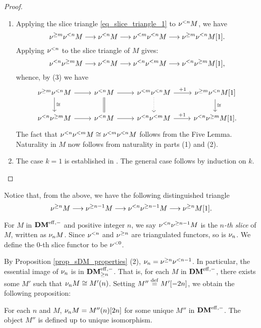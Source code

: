 \begin{proof}
\begin{enumerate}
\item Applying the slice triangle \eqref{eq_slice_triangle_1} to
$\slDM{n} M$, we have
\[
\sgDM{m} \slDM{n} M \to \slDM{n} M \to \slDM{m} \slDM{n} M \to
\sgDM{m} \slDM{n} M[1].
\]
Applying $\slDM{n}$ to the slice triangle of $M$ gives:
\[
\slDM{n} \sgDM{m} M \to \slDM{n} M \to \slDM{n} \slDM{m} M \to
\slDM{n} \sgDM{m} M[1],
\]
whence, by (3) we have
\[
\begin{tikzcd}
\sgDM{m} \slDM{n} M \arrow{r} \arrow{d}{\cong} &
\slDM{n} M \arrow{r} \arrow[equals]{d} &
\slDM{m} \slDM{n} M \arrow{r}{+1} \arrow[dotted]{d} &
\sgDM{m} \slDM{n} M[1] \arrow{d}{\cong}\\
\slDM{n} \sgDM{m} M \arrow{r} &
\slDM{n} M \arrow{r} &
\slDM{n} \slDM{m} M \arrow{r}{+1} &
\slDM{n} \sgDM{m} M[1].
\end{tikzcd}
\]
The fact that $\slDM{n} \slDM{m} M \cong \slDM{m} \slDM{n} M$
follows from the Five Lemma. Naturality in $M$ now follows from
naturality in parts (1) and (2).

\item The case $k = 1$ is established in \cite[Cor. 1.4]{HuKa}.
The general case follows by induction on $k$. \qedhere
\end{enumerate}
\end{proof}

Notice that, from the above, we have the following distinguished
triangle
\begin{equation}
\sgDM{n} M \to \sgDM{n - 1} M \to \slDM{n} \sgDM{n - 1} M
\to \sgDM{n} M[1].
\end{equation}

\begin{defn}\label{def_slice_functors_DMeff}
For $M$ in $\DMeff$ and positive integer $n$, we say 
$\slDM{n}\sgDM{n - 1}M$ is the \emph{$n$-th slice} of $M$, written 
as $\sliceDM{n}M$. Since $\slDM{n}$ and $\sgDM{n}$ are 
triangulated functors, so is $\sliceDM{n}$. We define the $0$-th
slice functor to be $\slDM{0}$.
\end{defn}

By Proposition \ref{prop_sDM_properties} (2), $\sliceDM{n} =
\sgDM{n}\slDM{n - 1}$. In particular, the essential image of
$\sliceDM{n}$ is in $\GFiltDM[n]{\DMeff}$. That is, for each $M$ in 
$\DMeff$, there exists some $M'$ such that $\sliceDM{n}M \cong 
\tZ[n]{M'}$. Setting $M'' \defeq M'[-2n]$, we obtain the following 
proposition:

\begin{prop}
\label{prop_DMeff_slice_fund_invariant}
For each $n$ and $M$, $\sliceDM{n}M = \tZ[n]{M''}[2n]$ for some 
unique $M''$ in $\DMeff$. The object $M''$ is defined up to
unique isomorphism.
\end{prop}

